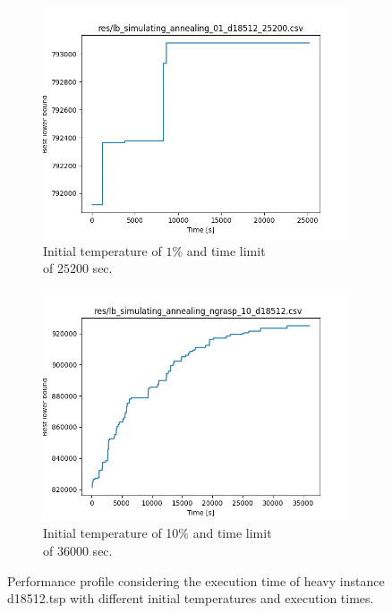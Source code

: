 \begin{figure}[!h]
	\begin{subfigure}{.5\columnwidth}
		\centering
		\includegraphics[width=\columnwidth]{../res/lb_simulating_annealing_n_grasp_01_d18512_25200.png}
		\caption{Initial temperature of $1$\% and time limit \protect\\ of $25200$ sec.}
		\label{fig:sim_ann_1_d18512}
	\end{subfigure}
	\begin{subfigure}{.5\columnwidth}
		\centering
		\includegraphics[width=\columnwidth]{../res/lb_simulating_annealing_ngrasp_10_d18512_36000.png}
		\caption{Initial temperature of 10\% and time limit \protect\\ of $36000$ sec.}
		\label{fig:sim_ann_10_d18512}
	\end{subfigure}
	\caption{Performance profile considering the execution time of heavy instance d18512.tsp with different initial temperatures and execution times.}
	\label{fig:sim_ann_heavy}
\end{figure}
